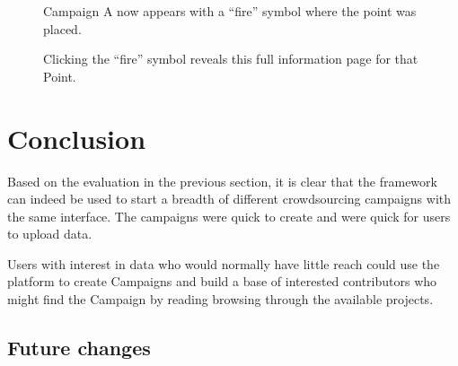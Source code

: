 \documentclass{article}
\let\oldsection\section
\renewcommand\section{\clearpage\oldsection}
\begin{document}
		\begin{figure}[ht]
			\centering
			\caption{Campaign A now appears with a ``fire'' symbol where the point was placed.}
			\label{fig:eval-submita-3}
		\end{figure}

		\begin{figure}[ht]
			\centering
			\caption{Clicking the ``fire'' symbol reveals this full information page for that Point.}
			\label{fig:eval-submita-4}
		\end{figure}

	\section{Conclusion}
	\label{sec:conclusion}

		Based on the evaluation in the previous section, it is clear that the framework can indeed be used to start a breadth of different crowdsourcing campaigns with the same interface. The campaigns were quick to create and were quick for users to upload data.

		Users with interest in data who would normally have little reach could use the platform to create Campaigns and build a base of interested contributors who might find the Campaign by reading browsing through the available projects.

		\subsection{Future changes}
\end{document}
